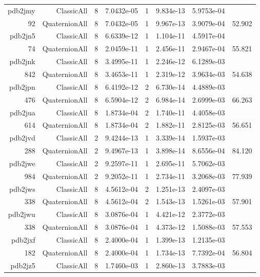 \begin{xltabular}{\textwidth}{r|rcS[table-format=1.4e+2]cS[table-format=1.3e+2]S[table-format=1.4e+2]S[table-format=-1.3]}
pdb2jmy & ClassicAll & 8 & 7.0432e-05 & 1 & 9.834e-13 & 5.9753e-04 & \\
92 & QuaternionAll & 8 & 7.0432e-05 & 1 & 9.967e-13 & 3.9079e-04 & 52.902\\  \addlinespace
pdb2jn5 & ClassicAll & 8 & 6.6339e-12 & 1 & 1.104e-11 & 4.5917e-04 & \\
74 & QuaternionAll & 8 & 2.0459e-11 & 1 & 2.456e-11 & 2.9467e-04 & 55.821\\  \addlinespace
pdb2jnk & ClassicAll & 8 & 3.4995e-11 & 1 & 2.246e-12 & 6.1289e-03 & \\
842 & QuaternionAll & 8 & 3.4653e-11 & 1 & 2.319e-12 & 3.9634e-03 & 54.638\\  \addlinespace
pdb2jpn & ClassicAll & 8 & 6.4192e-12 & 2 & 6.730e-14 & 4.4889e-03 & \\
476 & QuaternionAll & 8 & 6.5904e-12 & 2 & 6.984e-14 & 2.6999e-03 & 66.263\\  \addlinespace
pdb2jua & ClassicAll & 8 & 1.8734e-04 & 2 & 1.740e-11 & 4.4058e-03 & \\
614 & QuaternionAll & 8 & 1.8734e-04 & 2 & 1.882e-11 & 2.8125e-03 & 56.651\\  \addlinespace
pdb2jvd & ClassicAll & 2 & 9.4244e-13 & 1 & 3.339e-14 & 1.5937e-03 & \\
288 & QuaternionAll & 2 & 9.4967e-13 & 1 & 3.898e-14 & 8.6556e-04 & 84.120\\  \addlinespace
pdb2jwe & ClassicAll & 2 & 9.2597e-11 & 1 & 2.695e-11 & 5.7062e-03 & \\
984 & QuaternionAll & 2 & 9.2052e-11 & 1 & 2.734e-11 & 3.2068e-03 & 77.939\\  \addlinespace
pdb2jws & ClassicAll & 8 & 4.5612e-04 & 2 & 1.251e-13 & 2.4097e-03 & \\
338 & QuaternionAll & 8 & 4.5612e-04 & 2 & 1.543e-13 & 1.5261e-03 & 57.901\\  \addlinespace
pdb2jwu & ClassicAll & 8 & 3.0876e-04 & 1 & 4.421e-12 & 2.3772e-03 & \\
338 & QuaternionAll & 8 & 3.0876e-04 & 1 & 4.373e-12 & 1.5088e-03 & 57.553\\  \addlinespace
pdb2jxf & ClassicAll & 8 & 2.4000e-04 & 1 & 1.399e-13 & 1.2135e-03 & \\
182 & QuaternionAll & 8 & 2.4000e-04 & 1 & 1.734e-13 & 7.7392e-04 & 56.804\\  \addlinespace
pdb2jz5 & ClassicAll & 8 & 1.7460e-03 & 1 & 2.860e-13 & 3.7883e-03 & \\

\end{xltabular}
